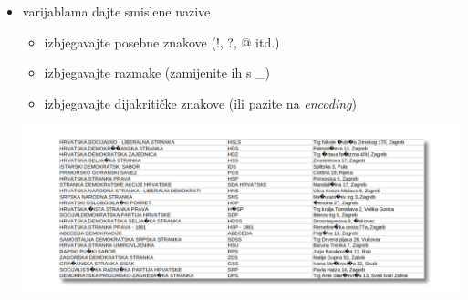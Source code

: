\documentclass[handout,aspectratio=169]{beamer}
\begin{document}
\begin{frame}
    \begin{itemize}
        \setlength{\itemsep}{2em}

        \item varijablama dajte smislene nazive

            \begin{itemize}
                \item izbjegavajte posebne znakove (!, ?, @ itd.)

                \item izbjegavajte razmake (zamijenite ih s \_)

                \item izbjegavajte dijakritičke znakove (ili pazite na
                    \textit{encoding})

            \end{itemize}

            \pause

            \vspace*{1.5em}

            \begin{center}

            \includegraphics[scale=.32]{images/meaningless-party.png}

            \end{center}

    \end{itemize}
\end{frame}
\end{document}
